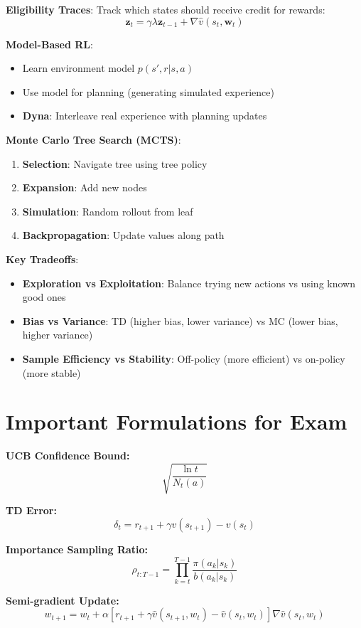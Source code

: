 \documentclass[a4paper,11pt]{article}
\newcommand{\cf}[1]{\[#1\]}
\newcommand{\f}[1]{${#1}$}
\renewcommand{\b}[1]{\textbf{#1}}
\begin{document}
\textbf{Eligibility Traces}: Track which states should receive credit for rewards:
\cf{\mathbf{z}_t = \gamma \lambda \mathbf{z}_{t-1} + \nabla \hat{v}(s_t,\mathbf{w}_t)}

\b{Model-Based RL}:
\begin{itemize}
    \item Learn environment model \f{p(s',r|s,a)}
    \item Use model for planning (generating simulated experience)
    \item \textbf{Dyna}: Interleave real experience with planning updates
\end{itemize}

\textbf{Monte Carlo Tree Search (MCTS)}:
\begin{enumerate}
    \item \textbf{Selection}: Navigate tree using tree policy
    \item \textbf{Expansion}: Add new nodes
    \item \textbf{Simulation}: Random rollout from leaf
    \item \textbf{Backpropagation}: Update values along path
\end{enumerate}

\b{Key Tradeoffs}:
\begin{itemize}
    \item \textbf{Exploration vs Exploitation}: Balance trying new actions vs using known good ones
    \item \textbf{Bias vs Variance}: TD (higher bias, lower variance) vs MC (lower bias, higher variance)  
    \item \textbf{Sample Efficiency vs Stability}: Off-policy (more efficient) vs on-policy (more stable)
\end{itemize}

\section{Important Formulations for Exam}

\textbf{UCB Confidence Bound:}
$$\sqrt{\frac{\ln t}{N_t(a)}}$$

\textbf{TD Error:}
$$\delta_t = r_{t+1} + \gamma v(s_{t+1}) - v(s_t)$$

\textbf{Importance Sampling Ratio:}
$$\rho_{t:T-1} = \prod_{k=t}^{T-1} \frac{\pi(a_k|s_k)}{b(a_k|s_k)}$$

\textbf{Semi-gradient Update:}
$$w_{t+1} = w_t + \alpha[r_{t+1} + \gamma \hat{v}(s_{t+1}, w_t) - \hat{v}(s_t, w_t)]\nabla \hat{v}(s_t, w_t)$$
\end{document}
